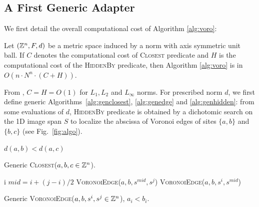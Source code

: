 \documentclass{llncs}
\begin{document}
\subsection{A First Generic Adapter}
\label{sec:first-gener-adapt}
We first detail the overall computational cost of Algorithm
\ref{alg:voro}:
\begin{lemma}
\label{lem:generic}
Let $({\mathbb{Z}}^n, F, d)$ be a metric space induced by a norm with axis
symmetric unit ball. If $C$ denotes the computational cost of
\textsc{Closest} predicate and $H$ is the computational cost of the
\textsc{HiddenBy} predicate, then Algorithm \ref{alg:voro} is in
$O(n\cdot N^n\cdot (C+H))$.
\end{lemma}
From \cite{BreuEtAl95,roerdnik}, $C=H=O(1)$ for $L_1,L_2$ and $L_\infty$
norms.  For prescribed norm $d$, we first define generic
Algorithms~\ref{alg:genclosest}, \ref{alg:genedge} and
\ref{alg:genhidden}: from some evaluations of $d$, \textsc{HiddenBy}
predicate is obtained by a dichotomic search on the 1D image span $S$
to localize the abscissa of Voronoi edges of sites $\{a,b\}$ and
$\{b,c\}$ (see Fig.~\ref{fig:algo}).

\begin{algorithm}[H]\footnotesize
  \Return $d(a,b) < d(a,c)$\;
  \caption{\footnotesize Generic \textsc{Closest}($a,b,c\in{\mathbb{Z}}^n$).\label{alg:genclosest}}
\end{algorithm}

\begin{algorithm}[H]\footnotesize
     {
       \Return  i\;
     }
     $mid  = i + (j-i)/2$\;
       {
         \Return \textsc{VoronoiEdge}($a,b,s^{mid},s^j$)
}
 {
         \Return \textsc{VoronoiEdge}($a,b,s^{i},s^{mid}$)
}

  \caption{\footnotesize Generic \textsc{VoronoiEdge}($a,b,s^i,s^j\in{\mathbb{Z}}^n$), $a_i<b_i$.\label{alg:genedge}}
\end{algorithm}
\end{document}
